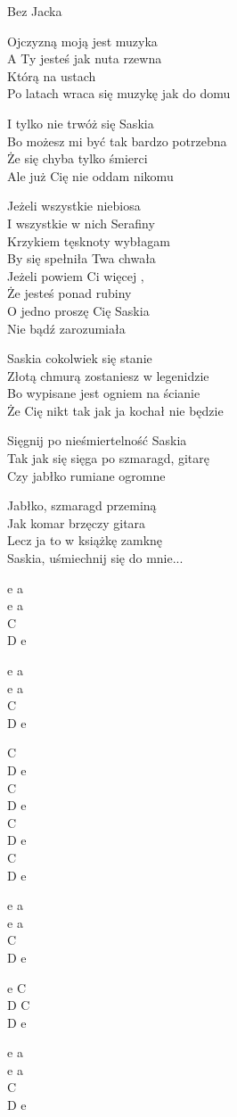 {}
{Bez Jacka}
\begin{text}
Ojczyzną moją jest muzyka\\
A Ty jesteś jak nuta rzewna\\
Którą na ustach\\
Po latach wraca się muzykę jak do domu

I tylko nie trwóż się Saskia\\
Bo możesz mi być tak bardzo potrzebna\\
Że się chyba tylko śmierci\\
Ale już Cię nie oddam nikomu

Jeżeli wszystkie niebiosa\\
I wszystkie w nich Serafiny\\
Krzykiem tęsknoty wybłagam\\
By się spełniła Twa chwała\\
Jeżeli powiem Ci więcej ,\\
Że jesteś ponad rubiny\\
O jedno proszę Cię Saskia\\
Nie bądź zarozumiała

Saskia cokolwiek się stanie\\
Złotą chmurą zostaniesz w legenidzie\\
Bo wypisane jest ogniem na ścianie\\
Że Cię nikt tak jak ja kochał nie będzie

Sięgnij po nieśmiertelność Saskia\\
Tak jak się sięga po szmaragd, gitarę\\
Czy jabłko rumiane ogromne

Jabłko, szmaragd przeminą\\
Jak komar brzęczy gitara\\
Lecz ja to w książkę zamknę\\
Saskia, uśmiechnij się do mnie...
\end{text}
\begin{chord}
    e a\\
    e a\\
    C\\
    D e

    e a\\
    e a\\
    C\\
    D e

    C\\
    D e\\
    C\\
    D e\\
    C\\
    D e\\
    C\\
    D e

    e a\\
    e a\\
    C\\
    D e

    e C\\
    D C\\
    D e

    e a\\
    e a\\
    C\\
    D e
\end{chord}